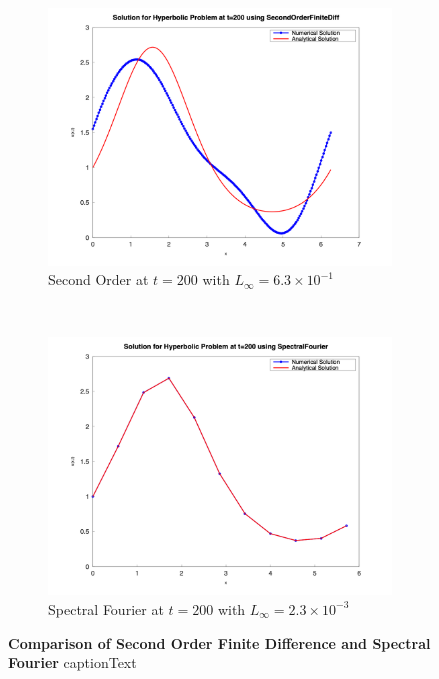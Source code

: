 \begin{figure}[H]
\begin{subfigure}{0.5\textwidth}
	\end{subfigure}\\
	\begin{subfigure}{0.5\textwidth}
		\includegraphics[width=\textwidth]{media/hyperbolic_SecondOrderFiniteDiff_200.png}
		\caption{Second Order at $t=200$ with $L_\infty = 6.3 \times 10^{-1}$}
		\label{sfig:sublabel5}
	\end{subfigure}%
	~
	\begin{subfigure}{0.5\textwidth}
		\includegraphics[width=\textwidth]{media/hyperbolic_SpectralFourier_200.png}
		\caption{Spectral Fourier at $t=200$ with $L_\infty = 2.3 \times 10^{-3}$}
		\label{sfig:sublabel6}
	\end{subfigure}

	\caption{\textbf{Comparison of Second Order Finite Difference and Spectral Fourier}
		captionText
	}
	\label{fig:figureLabel}
\end{figure}
